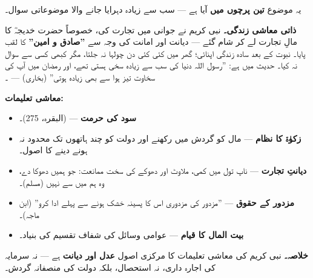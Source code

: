 \begin{hal}
یہ موضوع \textbf{تین پرچوں میں} آیا ہے --- سب سے زیادہ دہرایا جانے والا
موضوعاتی سوال۔

\medskip
\textbf{ذاتی معاشی زندگی۔} نبی کریم \saw نے جوانی میں تجارت کی، خصوصاً
حضرت خدیجہؓ کا مالِ تجارت لے کر شام گئے --- دیانت اور امانت کی وجہ سے
\textbf{''صادق و امین''} کا لقب پایا۔ نبوت کے بعد سادہ زندگی اپنائی؛ گھر
میں کئی کئی دن چولہا نہ جلتا، مگر کبھی کسی سے سوال نہ کیا۔ حدیث میں ہے:
''رسول اللہ \saw دنیا کی سب سے زیادہ سخی ہستی تھے، اور رمضان میں آپ کی
سخاوت تیز ہوا سے بھی زیادہ ہوتی'' (بخاری) --- ۔

\medskip
\textbf{معاشی تعلیمات:}
\begin{itemize}\setlength{\itemsep}{1pt}
  \item \textbf{سود کی حرمت} ---  (البقرہ، \textenglish{275})۔
  \item \textbf{زکوٰۃ کا نظام} --- مال کو گردش میں رکھنے اور دولت کو چند
        ہاتھوں تک محدود نہ ہونے دینے کا اصول۔
  \item \textbf{دیانتِ تجارت} --- ناپ تول میں کمی، ملاوٹ اور دھوکے کی
        سخت ممانعت: جو ہمیں دھوکا دے، وہ ہم میں سے نہیں (مسلم)۔
  \item \textbf{مزدور کے حقوق} --- ''مزدور کی مزدوری اس کا پسینہ خشک ہونے
        سے پہلے ادا کرو'' (ابن ماجہ)۔
  \item \textbf{بیت المال کا قیام} --- عوامی وسائل کی شفاف تقسیم کی
        بنیاد۔
\end{itemize}

\medskip
\textbf{خلاصہ۔} نبی کریم \saw کی معاشی تعلیمات کا مرکزی اصول \textbf{عدل
اور دیانت} ہے --- نہ سرمایہ کی اجارہ داری، نہ استحصال، بلکہ دولت کی
منصفانہ گردش۔
\end{hal}
